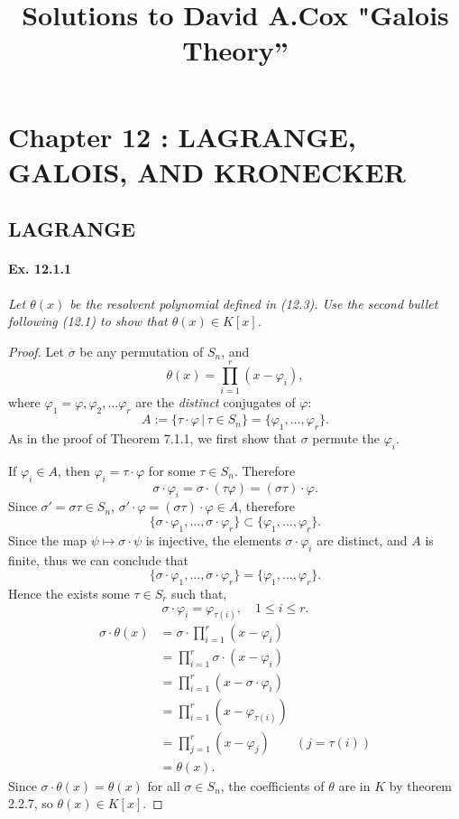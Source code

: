 \documentclass[11pt,a4paper]{article}
\title{Solutions to David A.Cox  "Galois Theory''}
\begin{document}
\section{Chapter 12 : LAGRANGE, GALOIS, AND KRONECKER}

\subsection{LAGRANGE}
\paragraph{Ex. 12.1.1}

{\it Let $\theta(x)$ be the resolvent polynomial defined in (12.3). Use the second bullet following (12.1) to show that $\theta(x) \in K[x]$.
}

\begin{proof} Let $\sigma$ be any permutation of $S_n$, and
$$\theta(x) = \prod_{i=1}^r (x-\varphi_i),$$
where $\varphi_1 = \varphi, \varphi_2,\ldots \varphi_r$ are the {\it distinct} conjugates of $\varphi$:
$$A := \{\tau \cdot \varphi\, | \, \tau \in S_n\} = \{\varphi_1,\ldots,\varphi_r\}.$$
As in the proof of Theorem 7.1.1, we first show that $\sigma$ permute the $\varphi_i$.

If $\varphi_i \in A$, then $\varphi_i = \tau \cdot \varphi$ for some $\tau \in S_n$. Therefore
$$\sigma \cdot \varphi_i = \sigma \cdot (\tau \varphi) = (\sigma \tau) \cdot \varphi.$$
Since $\sigma' = \sigma \tau \in S_n$, $\sigma' \cdot \varphi = (\sigma \tau) \cdot \varphi \in A$, therefore
$$\{\sigma \cdot \varphi_1,\ldots, \sigma \cdot \varphi_r\} \subset \{\varphi_1,\ldots,\varphi_r\}.$$
Since the map $\psi \mapsto \sigma \cdot \psi$ is injective, the elements $\sigma \cdot \varphi_i$ are distinct, and $A$ is finite, thus we can conclude that 
$$\{\sigma \cdot \varphi_1,\ldots, \sigma \cdot \varphi_r\} = \{\varphi_1,\ldots,\varphi_r\}.$$
Hence the exists some $\tau \in S_r$ such that, 
$$\sigma \cdot \varphi_i =\varphi_{\tau(i)},\quad 1\leq i \leq r.$$
\begin{align*}
\sigma \cdot \theta(x) &= \sigma \cdot  \prod_{i=1}^r (x-\varphi_i)\\
&= \prod_{i=1}^r \sigma \cdot (x-\varphi_i)\\
&= \prod_{i=1}^r (x-  \sigma \cdot \varphi_i)\\
&= \prod_{i=1}^r   (x-\varphi_{\tau(i)})\\
&= \prod_{j=1}^r   (x-\varphi_j) \qquad (j = \tau(i))\\
&=\theta(x).
\end{align*}
Since $\sigma \cdot \theta(x)  = \theta(x)$ for all $\sigma \in S_n$, the coefficients of $\theta$ are in $K$ by theorem 2.2.7, so $\theta(x) \in K[x]$.
\end{proof}
\end{document}
